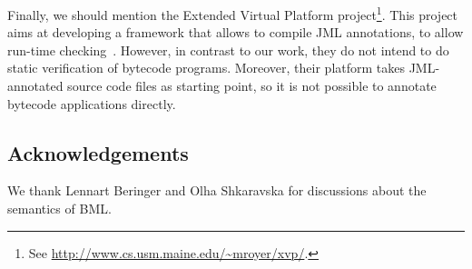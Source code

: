 Finally, we should mention the Extended Virtual Platform
project\footnote{See
\url{http://www.cs.usm.maine.edu/~mroyer/xvp/}.}. This project aims at
developing a framework that allows to compile JML annotations, to
allow run-time checking~\cite{AlagicXVP05}. However, in contrast to
our work, they do not intend to do static verification of bytecode
programs. Moreover, their platform takes JML-annotated source code
files as starting point, so it is not possible to annotate bytecode
applications directly.


\subsection*{Acknowledgements}
We thank Lennart Beringer and Olha Shkaravska for discussions about
the semantics of BML. 
